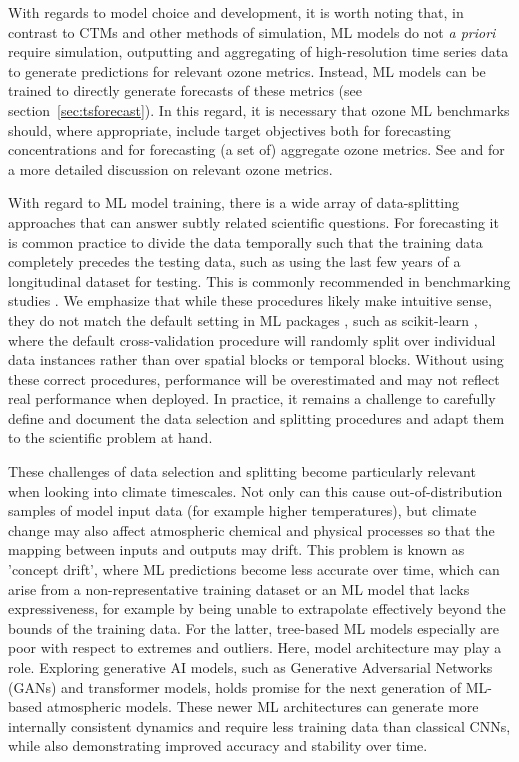 \documentclass[gmd, manuscript]{copernicus}
\begin{document}
With regards to model choice and development, it is worth noting that, in contrast to CTMs and other methods of simulation, ML models do not \emph{a priori} require simulation, outputting and aggregating of high-resolution time series data to generate predictions for relevant ozone metrics. Instead, ML models can be trained to directly generate forecasts of these metrics (see section~\ref{sec:tsforecast}). In this regard, it is necessary that ozone ML benchmarks should, where appropriate, include target objectives both for forecasting concentrations and for forecasting (a set of) aggregate ozone metrics. See \citet{Fleming2018} and \citet{Lefohn2018} for a more detailed discussion on relevant ozone metrics. 

With regard to ML model training, there is a wide array of data-splitting approaches that can answer subtly related scientific questions. For forecasting it is common practice to divide the data temporally such that the training data completely precedes the testing data, such as using the last few years of a longitudinal dataset for testing. This is commonly recommended in benchmarking studies \citep{lam_learning_2023, Rasp2020}. 
We emphasize that while these procedures likely make intuitive sense, they do not match the default setting in ML packages \citep{schultz_can_2021}, such as scikit-learn \citep{pedregosa_scikit-learn_2011}, where the default cross-validation procedure will randomly split over individual data instances rather than over spatial blocks or temporal blocks. Without using these correct procedures, performance will be overestimated and may not reflect real performance when deployed. In practice, it remains a challenge to carefully define and document the data selection and splitting procedures and adapt them to the scientific problem at hand.

These challenges of data selection and splitting become particularly relevant when looking into climate timescales. Not only can this cause out-of-distribution samples of model input data (for example higher temperatures), but climate change may also affect atmospheric chemical and physical processes so that the mapping between inputs and outputs may drift. This problem is known as 'concept drift', where ML predictions become less accurate over time, which can arise from a non-representative training dataset or an ML model that lacks expressiveness, for example by being unable to extrapolate effectively beyond the bounds of the training data. For the latter, tree-based ML models especially are poor with respect to extremes and outliers. Here, model architecture may play a role. Exploring generative AI models, such as Generative Adversarial Networks (GANs) and transformer models, holds promise for the next generation of ML-based atmospheric models. These newer ML architectures can generate more internally consistent dynamics and require less training data than classical CNNs, while also demonstrating improved accuracy and stability over time. 
\end{document}
